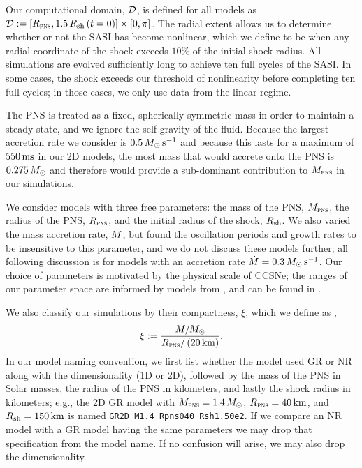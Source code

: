 Our computational domain, $\mathcal{D}$, is defined for all models as
$\mathcal{D}:=\left[R_{\textsc{pns}},1.5\,R_{\mathrm{sh}}\left(t=0\right)\right]\times\left[0,\pi\right]$.
The radial extent allows us to determine whether or not the SASI
has become nonlinear, which we define to be when any radial coordinate
of the shock exceeds $10\%$ of the initial shock radius.
All simulations are evolved sufficiently long to achieve ten
full cycles of the SASI.
In some cases, the shock exceeds our threshold of nonlinearity before
completing ten full cycles;
in those cases, we only use data from the linear regime.

The PNS is treated as a fixed, spherically symmetric mass
in order to maintain a steady-state,
and we ignore the self-gravity of the fluid.
Because the largest accretion rate we consider
is $0.5\,M_{\odot}\,\mathrm{s}^{-1}$ and because this
lasts for a maximum of $550\,\mathrm{ms}$ in our 2D models,
the most mass that would accrete onto the PNS is $0.275\,M_{\odot}$
and therefore would provide
a sub-dominant contribution to $M_{\textsc{pns}}$ in our simulations.

We consider models with three free parameters:
the mass of the PNS, $M_{\textsc{pns}}$,
the radius of the PNS, $R_{\textsc{pns}}$,
and the initial radius of the shock, $R_{\mathrm{sh}}$.
We also varied the mass accretion rate, $\dot{M}$, but found the
oscillation periods and growth rates to be insensitive to this
parameter, and we do not discuss these models further;
all following discussion
is for models with an accretion rate $\dot{M}=0.3\,M_{\odot}\,\mathrm{s}^{-1}$.
Our choice of parameters is motivated by the physical scale of CCSNe;
the ranges of our parameter space are informed
by models from \citet{lmt2001,bmh2013,mjm2015,brv2020,wtj2020},
and can be found in .

We also classify our simulations by their compactness, $\xi$, which we
define as \citep{oo2011},
\begin{equation}
  \xi:=\frac{M/M_{\odot}}{R_{\textsc{pns}}/\left(20\,\mathrm{km}\right)}.
  \label{eq.AP.compactness}
\end{equation}
In our model naming convention,
we first list whether the model used GR or NR along with the dimensionality
(1D or 2D),
followed by the mass of the PNS in Solar masses, the radius of the PNS
in kilometers,
and lastly the shock radius in kilometers; e.g.,
the 2D GR model with $M_{\textsc{pns}}=1.4\,M_{\odot}$, $R_{\textsc{pns}}=40\,\mathrm{km}$,
and $R_{\mathrm{sh}}=150\,\mathrm{km}$ is named \texttt{GR2D\_M1.4\_Rpns040\_Rsh1.50e2}.
If we compare an NR model with a GR model having the same parameters
we may drop that specification from the model name.
If no confusion will arise, we may also drop the dimensionality.

